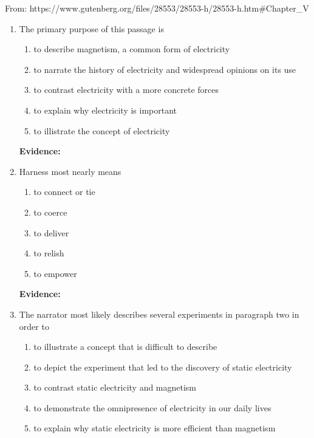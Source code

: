 From: https://www.gutenberg.org/files/28553/28553-h/28553-h.htm\#Chapter\_V

\begin{enumerate}

\item The primary purpose of this passage is 

\bigskip
\begin{enumerate}[label=(\Alph*)]
\item to describe magnetism, a common form of electricity
\item to narrate the history of electricity and widespread opinions on its use
\item to contrast electricity with a more concrete forces
\item to explain why electricity is important
\item to illistrate the concept of electricity
\end{enumerate}

\bigskip
\textbf{Evidence:} \hrulefill

\item Harness most nearly means

\bigskip
\begin{enumerate}[label=(\Alph*)]
\item to connect or tie
\item to coerce
\item to deliver
\item to relish
\item to empower
\end{enumerate}

\bigskip
\textbf{Evidence:} \hrulefill

\item The narrator most likely describes several experiments in paragraph two in order to

\bigskip
\begin{enumerate}[label=(\Alph*)]
\item to illustrate a concept that is difficult to describe
\item to depict the experiment that led to the discovery of static electricity
\item to contrast static electricity and magnetism 
\item to demonstrate the omnipresence of electricity in our daily lives
\item to explain why static electricity is more efficient than magnetism 
\end{enumerate}


\end{enumerate}
